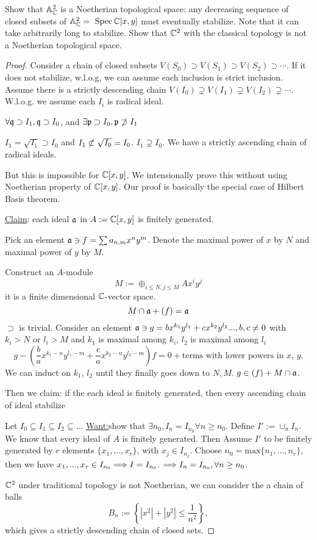\begin{exr}
Show that $\mathbb A^2_\mathbb C$ is a Noetherian topological space: any decreasing sequence of closed subsets of $\mathbb A^2_\mathbb C = \text{ Spec\,} \mathbb C[x, y]$ must eventually stabilize. Note that it can take arbitrarily long to stabilize.  Show that $\mathbb C^2$ with the classical topology is not a Noetherian topological space.
\end{exr}
\begin{proof}
Consider a chain of closed subsets $V(S_0)\supset V(S_1)\supset V(S_2)\supset \cdots $. If it does not stabilize, w.l.o.g, we can assume each inclusion is strict inclusion. Assume there is a strictly descending chain $V(I_0)\supsetneq V(I_1)\supsetneq V(I_2)\supsetneq \cdots$. W.l.o.g. we assume each $I_i$ is radical ideal.

$\forall \mathfrak q\supset I_1, \mathfrak q\supset I_0$, and $\exists {\mathfrak p}\supset I_0, {\mathfrak p}\not \supset I_1$

$
I_1=\sqrt{I_1}\supset I_0
$
and $I_1\not \subset \sqrt{I_0}=I_0$. $I_1\supsetneq I_0$. We have a strictly ascending chain of radical ideals.

But this is impossible for $\mathbb C[x,y]$. We intensionally prove this without using Noetherian property of $\mathbb C[x,y]$. Our proof is basically the special case of Hilbert Basis theorem.

\underline{Claim}: each ideal ${\mathfrak a}$ in $A:=\mathbb C[x,y]$ is finitely generated.

Pick an element ${\mathfrak a}\ni f=\sum a_{n,m} x^ny^m$. Denote the maximal power of $x$ by $N$ and maximal power of $y$ by $M$.

Construct an $A$-module 
$$
M:=\oplus_{i\leq N,j\leq M}Ax^i y^j
$$
it is a finite dimensional $\mathbb C$-vector space.
$$
M\cap {\mathfrak a}+(f)={\mathfrak a}
$$
$\supset$ is trivial.
Consider an element ${\mathfrak a}\ni g=bx^{k_1}y^{l_1}+cx^{k_2}y^{l_2}...,b,c\neq 0$ with $k_i>N$ or $l_i>M$ and $k_1$ is maximal among $k_i$, $l_2$ is maximal among $l_i$
$$
g-\left(\frac{b}{a}x^{k_1-n}y^{l_1-m}+\frac{c}{a}x^{k_2-n}y^{l_2-m}\right)f=0+\text{terms with lower powers in $x$, $y$}.
$$
We can induct on $k_1$, $l_2$ until they finally goes down to $N,M$. $g\in (f)+M\cap{\mathfrak a}$.

Then we claim: if the each ideal is finitely generated, then every ascending chain of ideal stabilize

Let $I_0\subseteq I_1\subseteq I_2\subseteq ...$ \underline{Want:}show that $\exists n_0,I_n=I_{n_0}\forall n\geq n_0$.
Define $I':=\cup_n I_n$. We know that every ideal of ${A}$ is finitely generated. Then Assume $I'$ to be finitely generated by $r$ elements $\{x_1,...,x_r\}$, with $x_j\in I_{n_j}$. Choose $n_0=\text{max}\{n_1,...,n_r\}$, then we have $x_1,...,x_r\in I_{n_0}\Longrightarrow I=I_{n_0}$. $\Longrightarrow I_n=I_{n_0},\forall n\geq n_0$.

$\mathbb C^2$ under traditional topology is not Noetherian, we can consider the a chain of balls
$$
B_n:=\left\{|x^2|+|y^2|\leq \frac{1}{n^2}\right\},
$$
which gives a strictly descending chain of closed sets.
\end{proof}

